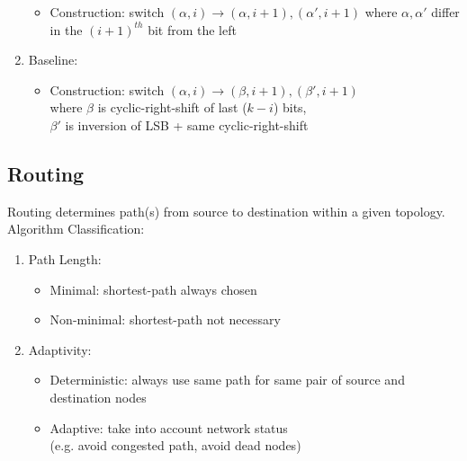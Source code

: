 \documentclass[12pt, a4paper]{article}
\begin{document}
\begin{multicols*}{3}
\begin{enumerate}[\roman*.]
\begin{itemize}[leftmargin=*]
      \item Construction: switch $(\alpha, i) \rightarrow (\alpha,i+1), (\alpha', i+1)$ where $\alpha, \alpha'$ differ in the $(i+1)^{th}$ bit from the left
    \end{itemize}
  \item Baseline:
    \begin{itemize}[leftmargin=*]\vspace{3pt}
      \item Construction: switch $(\alpha, i) \rightarrow (\beta,i+1), (\beta',i+1)$\\where $\beta$ is cyclic-right-shift of last ($k-i$) bits,\\$\beta'$ is inversion of LSB + same cyclic-right-shift
    \end{itemize}
\end{enumerate}

\colbreak

\subsection{Routing}
Routing determines path(s) from source to destination within a given topology.
Algorithm Classification:
\begin{enumerate}[\roman*.]
  \item Path Length: 
    \begin{itemize}[leftmargin=*]\vspace{3pt}
      \item Minimal: shortest-path always chosen 
      \item Non-minimal: shortest-path not necessary
    \end{itemize}
  \item Adaptivity: 
    \begin{itemize}[leftmargin=*]\vspace{3pt}
      \item Deterministic: always use same path for same pair of source and destination nodes 
      \item Adaptive: take into account network status\\(e.g. avoid congested path, avoid dead nodes)
    \end{itemize}
\end{enumerate}


\end{multicols*}
\end{document}
